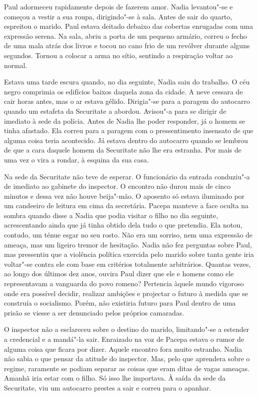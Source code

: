 Paul adormeceu rapidamente depois de fazerem amor. Nadia levantou"-se e
começou a vestir a sua roupa, dirigindo"-se à sala. Antes de sair do
quarto, espreitou o marido. Paul estava deitado debaixo das cobertas
enrugadas com uma expressão serena. Na sala, abriu a porta de um
pequeno armário, correu o fecho de uma mala atrás dos livros e tocou no
cano frio de um revólver durante alguns segundos. Tornou a colocar a
arma no sítio, sentindo a respiração voltar ao normal.

\bigskip

Estava uma tarde escura quando, no dia seguinte, Nadia saiu do trabalho.
O céu negro comprimia os edifícios baixos daquela zona da cidade. A
neve cessara de cair horas antes, mas o ar estava gélido. Dirigia"-se
para a paragem do autocarro quando um estafeta da Securitate a abordou.
Avisou"-a para se dirigir de imediato à sede da polícia. Antes de Nadia
lhe poder responder, já o homem se tinha afastado. Ela correu para a
paragem com o pressentimento insensato de que alguma coisa teria
acontecido. Já estava dentro do autocarro quando se lembrou de que a
cara daquele homem da Securitate não lhe era estranha. Por mais de uma
vez o vira a rondar, à esquina da sua casa.

Na sede da Securitate não
teve de esperar. O funcionário da entrada conduziu"-a de imediato ao
gabinete do inspector. O encontro não durou mais de cinco minutos e
dessa vez não houve beija"-mão. O aposento só estava iluminado por um
candeeiro de leitura em cima da secretária. Pacepa manteve a face
oculta na sombra quando disse a Nadia que podia visitar o filho no dia
seguinte, acrescentando ainda que já tinha obtido dela tudo o que
pretendia. Ela notou, contudo, um ténue esgar no seu rosto. Não era um
sorriso, nem uma expressão de ameaça, mas um ligeiro tremor de
hesitação. Nadia não fez perguntas sobre Paul, mas pressentiu que a
violência política exercida pelo marido sobre tanta gente iria voltar"-se
contra ele com base em critérios totalmente arbitrários. Quantas vezes,
ao longo dos últimos dez anos, ouvira Paul dizer que ele e homens como
ele representavam a vanguarda do povo romeno? Pertencia àquele mundo
vigoroso onde era possível decidir, realizar ambições e projectar o
futuro à medida que se construía o socialismo. Porém, não existiria
futuro para Paul dentro de uma prisão se viesse a ser denunciado pelos
próprios camaradas.

O inspector não a esclareceu sobre o destino do
marido, limitando"-se a estender a credencial e a mandá"-la sair.
Enraizado na voz de Pacepa estava o rumor de alguma coisa que ficara por
dizer. Aquele encontro fora muito estranho. Nadia não sabia o que pensar
da atitude do inspector. Mas, pelo que aprendera sobre o regime,
raramente se podiam separar as coisas que eram ditas de vagas ameaças.
Amanhã iria estar com o filho. Só isso lhe importava. À saída da sede da
Securitate, viu um autocarro prestes a sair e correu para o apanhar.

